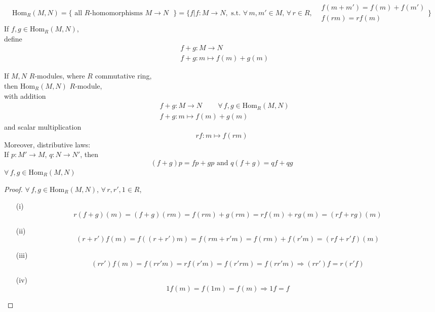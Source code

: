 \begin{definition}
\begin{equation}
\text{Hom}_R(M,N) = \lbrace \text{ all $R$-homomorphisms $M\to N$ } \rbrace = \lbrace f | f:M\to N , \text{ s.t. } \forall \, m,m' \in M, \, \forall \, r \in R, \begin{aligned} & f(m+m') =f(m) + f(m') \\ & f(rm) = rf(m) \end{aligned} \rbrace
\end{equation}
If $f,g \in \text{Hom}_R(M,N)$, \\
define
\begin{equation}
\begin{aligned}
& f+g:M \to N \\
& f+g:m\mapsto f(m) + g(m)
\end{aligned}
\end{equation}
\end{definition}

\begin{proposition}
	If $M,N$ $R$-modules, where $R$ commutative ring, \\
	then $\text{Hom}_R(M,N)$ $R$-module, \\
	with addition 
	\[
	\begin{aligned}
	& f+g: M\to N \qquad \  \forall \, f,g \in \text{Hom}_R(M,N) \\
	& f+g:m\mapsto f(m) + g(m)
	\end{aligned}
	\]
and scalar multiplication 
\[
rf:m \mapsto f(rm)
\]
	Moreover, distributive laws: \\
	If $p:M'\to M$, $q:N\to N'$, then 
	\[
	(f+g)p = fp+gp \text{ and } q(f+g) = qf + qg
	\]
$\forall \, f,g \in \text{Hom}_R(M,N)$	
	
	
	
\end{proposition}

\begin{proof}
	$\forall \, f,g \in \text{Hom}_R(M,N)$, $\forall \, r,r', 1 \in R$, 
	\begin{enumerate}
		\item[(i)] 
		\[
		r(f+g)(m) = (f+g)(rm) = f(rm) + g(rm) = rf(m) + rg(m) = (rf+rg)(m) 
		\]
		\item[(ii)]
		\[
		(r+r')f(m) = f((r+r')m) = f(rm+r'm) = f(rm) + f(r'm) = (rf+ r'f)(m)
		\]
		\item[(iii)]
		\[
		(rr')f(m) = f(rr'm) = rf(r'm) = f(r'rm) = f(rr'm) \Longrightarrow (rr')f = r(r'f)
		\]
		\item[(iv)]
		\[
		1f(m) = f(1m) = f(m) \Longrightarrow 1f =f
		\]
	\end{enumerate}
	\end{proof}



